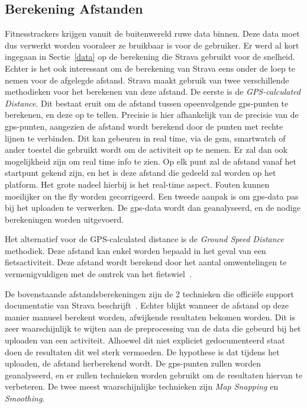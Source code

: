\subsection{Berekening Afstanden}
Fitnesstrackers krijgen vanuit de buitenwereld ruwe data binnen. Deze data moet
dus verwerkt worden vooraleer ze bruikbaar is voor de gebruiker. Er werd al
kort ingegaan in Sectie~\ref{data} op de berekening die Strava gebruikt voor de
snelheid. Echter is het ook interessant om de berekening van Strava eens onder
de loep te nemen voor de afgelegde afstand. Strava maakt gebruik van twee
verschillende methodieken voor het berekenen van deze afstand. De eerste is de
\textit{GPS-calculated Distance}. Dit bestaat eruit om de afstand tussen
opeenvolgende \ac{gps}-punten te berekenen, en deze op te tellen. Precisie is
hier afhankelijk van de precisie van de \ac{gps}-punten, aangezien de afstand
wordt berekend door de punten met rechte lijnen te verbinden. Dit kan gebeuren
in real time, via de gsm, smartwatch of ander toestel die gebruikt wordt om de
activiteit op te nemen. Er zal dan ook mogelijkheid zijn om real time info te
zien. Op elk punt zal de afstand vanaf het startpunt gekend zijn, en het is
deze afstand die gedeeld zal worden op het platform. Het grote nadeel hierbij
is het real-time aspect. Fouten kunnen moeilijker on the fly worden
gecorrigeerd. Een tweede aanpak is om \ac{gps}-data pas bij het uploaden te
verwerken. De \ac{gps}-data wordt dan geanalyseerd, en de nodige berekeningen
worden uitgevoerd.

Het alternatief voor de GPS-calculated distance is de \textit{Ground Speed
    Distance} methodiek. Deze afstand kan enkel worden bepaald in het geval van een
fietsactiviteit. Deze afstand wordt berekend door het aantal omwentelingen te
vermenigvuldigen met de omtrek van het fietswiel~\cite{HowDista47:online}.

De bovenstaande afstandsberekeningen zijn de 2 technieken die officiële support
documentatie van Strava beschrijft~\cite{HowDista47:online}. Echter blijkt
wanneer de afstand op deze manier manueel berekent worden, afwijkende
resultaten bekomen worden. Dit is zeer waarschijnlijk te wijten aan de
preprocessing van de data die gebeurd bij het uploaden van een activiteit.
Alhoewel dit niet expliciet gedocumenteerd staat doen de resultaten dit wel
sterk vermoeden. De hypothese is dat tijdens het uploaden, de afstand
herberekend wordt. De \ac{gps}-punten zullen worden geanalyseerd, en er zullen
technieken worden gebruikt om de resultaten hiervan te verbeteren. De twee
meest waarschijnlijke technieken zijn \textit{Map Snapping} en
\textit{Smoothing}.

